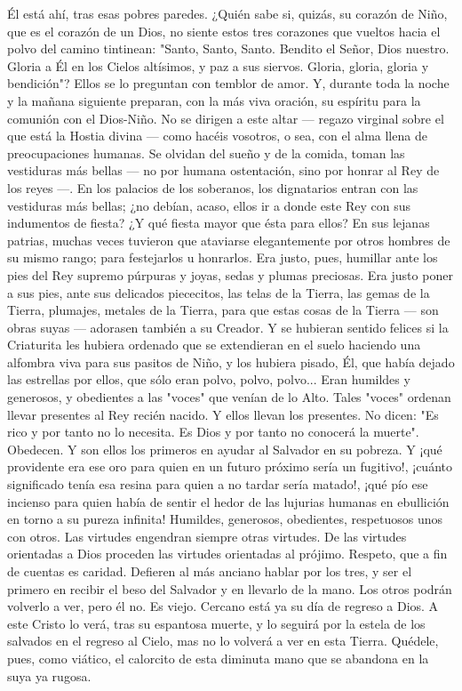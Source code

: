 \documentclass[12pt]{book} %
\begin{document}
Él está ahí, tras esas pobres paredes. ¿Quién sabe si, quizás, su corazón de Niño, que es el corazón de un Dios, no siente 
estos tres corazones que vueltos hacia el polvo del camino tintinean: "Santo, Santo, Santo. Bendito el Señor, Dios nuestro. Gloria a Él en los Cielos altísimos, y paz a sus siervos. Gloria, gloria, gloria y bendición"? Ellos se lo preguntan con temblor de amor. Y, durante toda la noche y la mañana siguiente preparan, con la más viva oración, su espíritu para la comunión con el Dios-Niño. 
No se dirigen a este altar — regazo virginal sobre el que está la Hostia divina — como hacéis vosotros, o sea, con el alma llena de preocupaciones humanas. Se olvidan del sueño y de la comida, toman las vestiduras más bellas — no por humana ostentación, sino por honrar al Rey de los reyes —. En los palacios de los soberanos, los dignatarios entran con las vestiduras más bellas; ¿no debían, acaso, ellos ir a donde este Rey con sus indumentos de fiesta? ¿Y qué fiesta mayor que ésta para ellos? 
En sus lejanas patrias, muchas veces tuvieron que ataviarse elegantemente por otros hombres de su mismo rango; para 
festejarlos u honrarlos. Era justo, pues, humillar ante los pies del Rey supremo púrpuras y joyas, sedas y plumas preciosas. Era justo poner a sus pies, ante sus delicados piececitos, las telas de la Tierra, las gemas de la Tierra, plumajes, metales de la Tierra, para que estas cosas de la Tierra — son obras suyas — adorasen también a su Creador. Y se hubieran sentido felices si la Criaturita les hubiera ordenado que se extendieran en el suelo haciendo una alfombra viva para sus pasitos de Niño, y los hubiera pisado, Él, que había dejado las estrellas por ellos, que sólo eran polvo, polvo, polvo...             
Eran humildes y generosos, y obedientes a las "voces" que venían de lo Alto. Tales "voces" ordenan llevar presentes al Rey recién nacido. Y ellos llevan los presentes. No dicen: "Es rico y por tanto no lo necesita. Es Dios y por tanto no conocerá la muerte". Obedecen. Y son ellos los primeros en ayudar al Salvador en su pobreza. Y ¡qué providente era ese oro para quien en un futuro próximo sería un fugitivo!, ¡cuánto significado tenía esa resina para quien a no tardar sería matado!, ¡qué pío ese incienso para quien había de sentir el hedor de las lujurias humanas en ebullición en torno a su pureza infinita!                         
Humildes, generosos, obedientes, respetuosos unos con otros. Las virtudes engendran siempre otras virtudes. De las 
virtudes orientadas a Dios proceden las virtudes orientadas al prójimo. Respeto, que a fin de cuentas es caridad. Defieren al más anciano hablar por los tres, y ser el primero en recibir el beso del Salvador y en llevarlo de la mano. Los otros podrán volverlo a ver, pero él no. Es viejo. Cercano está ya su día de regreso a Dios. A este Cristo lo verá, tras su espantosa muerte, y lo seguirá por la estela de los salvados en el regreso al Cielo, mas no lo volverá a ver en esta Tierra. Quédele, pues, como viático, el calorcito de esta diminuta mano que se abandona en la suya ya rugosa. 
\end{document}
